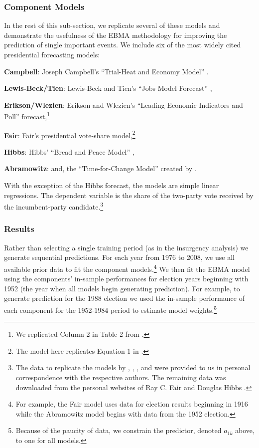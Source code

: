 \documentclass[pdftex,12pt,fullpage,oneside]{amsart}
\begin{document}
\subsubsection{Component Models}

In the rest of this sub-section, we replicate several of these models and
demonstrate the usefulness of the EBMA methodology for improving the
prediction of single important events.  We include six of the most widely cited
presidential forecasting models: 
\begin{list}{}{\leftmargin=1em}
\item \textbf{Campbell}: Joseph Campbell's ``Trial-Heat and Economy Model''
  \citep{Campbell:2008}.
\item \textbf{Lewis-Beck/Tien}: Lewis-Beck and Tien's ``Jobs Model Forecast'' \citep{Lewis-Beck:Tien:2008},
\item \textbf{Erikson/Wlezien}: Erikson and Wlezien's ``Leading Economic Indicators
  and Poll'' forecast,\footnote{We replicated Column 2 in Table 2 from \citet{Erikson:Wlezien:2008}.}
\item \textbf{Fair}: Fair's presidential vote-share model,\footnote{The model here replicates Equation 1 in \citet{Fair:2010}.}
\item \textbf{Hibbs}: Hibbs' ``Bread and Peace Model'' \citep{Hibbs:2000},
\item \textbf{Abramowitz}: and,  the ``Time-for-Change Model'' created by
  \citet{Abramowitz:2008}.  
\end{list}
\noindent With the exception of the Hibbs forecast, the models are
simple linear regressions. The dependent variable is the share of the
two-party vote received by the incumbent-party candidate.\footnote{The
  data to replicate the models by \citet{Abramowitz:2008},
  \citet{Campbell:2008}, \citet{Erikson:Wlezien:2008}, and
  \citet{Lewis-Beck:Tien:2008} were provided to us in personal
  correspondence with the respective authors.  The remaining data was
  downloaded from the personal websites of Ray C. Fair
  \citeyear{Fair2011} and Douglas Hibbs \citeyear{Hibbs2011}.}


\subsubsection{Results}

Rather than selecting a single training period (as in the insurgency
analysis) we generate sequential predictions.  For each
year from 1976 to 2008, we use all available prior data to fit the
component models.\footnote{For example, the Fair model uses data for election
  results beginning in 1916 while the Abramowitz model begins with
  data from the 1952 election. }  We then fit the EBMA model using the
components' in-sample performances for election years beginning with
1952 (the year when all models begin generating prediction).  For
example, to generate prediction for the 1988 election we used the
in-sample performance of each component for the 1952-1984 period to
estimate model weights.\footnote{Because of the paucity of data, we
  constrain the predictor, denoted $a_{1k}$ above, to one for all
  models.}
\end{document}
